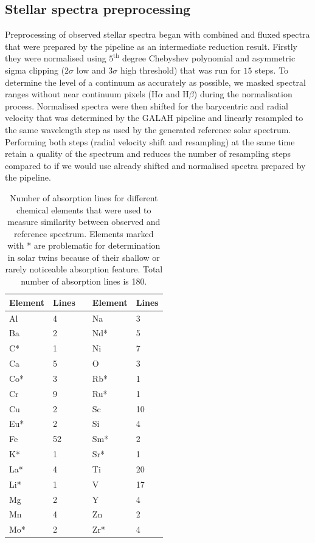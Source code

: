 \subsection{Stellar spectra preprocessing}
\label{sec:05_preprocessing}
Preprocessing of observed stellar spectra began with combined and fluxed spectra that were prepared by the pipeline as an intermediate reduction result. Firstly they were normalised using $5^\text{th}$ degree Chebyshev polynomial and asymmetric sigma clipping ($2\sigma$ low and $3\sigma$ high threshold) that was run for $15$ steps. To determine the level of a continuum as accurately as possible, we masked spectral ranges without near continuum pixels (H$\alpha$ and H$\beta$) during the normalisation process. Normalised spectra were then shifted for the barycentric and radial velocity that was determined by the GALAH pipeline and linearly resampled to the same wavelength step as used by the generated reference solar spectrum. Performing both steps (radial velocity shift and resampling) at the same time retain a quality of the spectrum and reduces the number of resampling steps compared to if we would use already shifted and normalised spectra prepared by the pipeline.

\begin{table}
	\centering
	\begin{tabular}{l | l c l | l }
		Element & Lines & & Element & Lines\\ \hline
		Al & 4 & & Na & 3\\ 
		Ba & 2 & & Nd* & 5\\ 
		C* & 1 & & Ni & 7\\ 
		Ca & 5 & & O & 3 \\ 
		Co* & 3 & & Rb* & 1\\ 
		Cr & 9 & & Ru* & 1\\ 
		Cu & 2 & & Sc & 10\\ 
		Eu* & 2 & & Si & 4\\ 
		Fe & 52 & & Sm* & 2\\ 
		K* & 1 & & Sr* & 1\\ 
		La* & 4 & & Ti & 20\\ 
		Li* & 1 & & V & 17\\ 
		Mg & 2 & & Y & 4\\ 
		Mn & 4 & & Zn & 2\\ 
		Mo* & 2 & & Zr* & 4 \\ 
	\end{tabular}
	\caption{Number of absorption lines for different chemical elements that were used to measure similarity between observed and reference spectrum. Elements marked with * are problematic for determination in solar twins because of their shallow or rarely noticeable absorption feature. Total number of absorption lines is 180.}
	\label{tab:elements_list}
\end{table}

